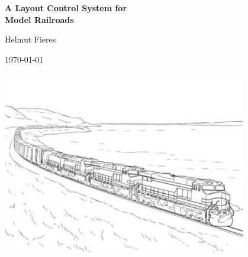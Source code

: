 \documentclass[a4paper, 11pt]{book}
\begin{document}
    \newcommand{\srcinputpath}{../../LcsNodes-Pico/}
    \newtoggle{includeListings}
    \togglefalse{includeListings} 
    
   	\thispagestyle{empty}

	\begingroup
		\enlargethispage{\textheight}
		\begin{center}
  		{\Huge \textbf{A Layout Control System for \\ Model Railroads}}\par
  		\vspace{1cm}
  		{\Large Helmut Fieres}\par
  		{\large \today}\par
  		\vspace{2cm}
    	\includegraphics[width=0.8\textwidth]{figures/Frontpage-Picture.png}
    	\end{center}
	\endgroup
	\clearpage
	       
	\cleardoublepage
		
	\setlength{\emergencystretch}{3em}  %
	\raggedbottom

	\frontmatter
	\pagestyle{fancy}
	\tableofcontents
\end{document}
